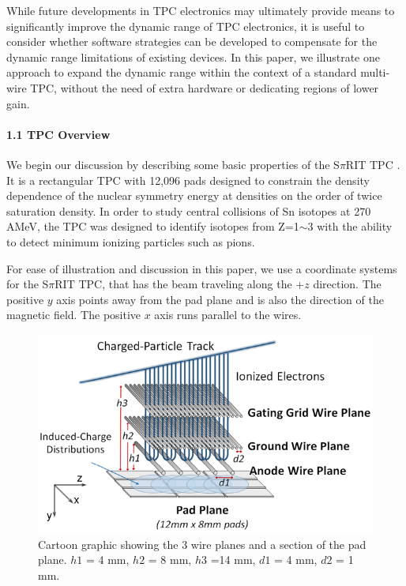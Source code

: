 \documentclass[review]{elsarticle}
\begin{document}
While future developments in TPC electronics may ultimately provide means to significantly improve the dynamic range of TPC electronics, it is useful to consider whether software strategies can be developed to compensate for the dynamic range limitations of existing devices. In this paper, we illustrate one approach to expand the dynamic range within the context of a standard multi-wire TPC, without the need of extra hardware or dedicating regions of lower gain.


\paragraph{1.1 TPC Overview}
We begin our discussion by describing some basic properties of the S$\pi$RIT TPC \citep{shane}. It is a rectangular TPC with 12,096 pads designed to constrain the density dependence of the nuclear symmetry energy at densities on the order of twice saturation density. In order to study central collisions of Sn isotopes at 270 AMeV, the TPC was designed to identify isotopes from Z=1$\sim$3 with the ability to detect minimum ionizing particles such as pions. 

For ease of illustration and discussion in this paper, we use a coordinate systems for the S$\pi$RIT TPC, that has the beam traveling along the +$z$ direction. The positive $y$ axis points away from the pad plane and is also the direction of the magnetic field. The positive $x$ axis runs parallel to the wires. 

\begin{figure}[ht!]
\includegraphics[width=\linewidth]{padwire}
\caption{Cartoon graphic showing the 3 wire planes and a section of the pad plane. $h1$ = 4 mm, $h2$ = 8 mm, $h3$ =14 mm, $d1$ = 4 mm, $d2$ = 1 mm.}
\label{fig:padwire}
\end{figure}
\end{document}
